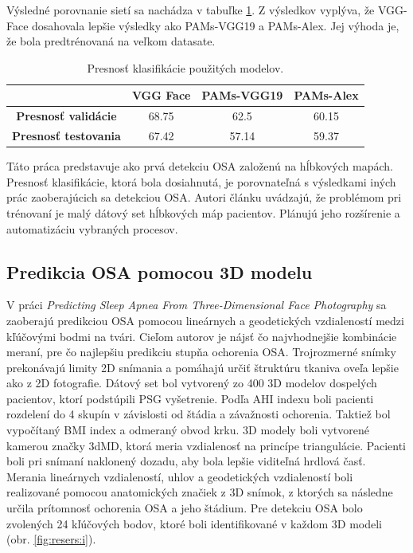 Výsledné porovnanie sietí sa nachádza v tabuľke \ref{tab:resers:2}. Z výsledkov vyplýva, že VGG-Face dosahovala lepšie výsledky ako PAMs-VGG19 a PAMs-Alex. Jej výhoda je, že bola predtrénovaná na veľkom datasate. 

\begin{table}[H]
	\caption{\label{tab:resers:2} Presnosť klasifikácie použitých modelov. }
	\centering
	\begin{tabular}{cccc}
		\toprule
		\textbf{} & \textbf{VGG Face} & \textbf{PAMs-VGG19} & \textbf{PAMs-Alex}     \\ 
		\midrule
		\textbf{Presnosť validácie}		& 68.75		& 62.5		& 60.15		\\ 
		\textbf{Presnosť testovania}	& 67.42		& 57.14  	& 59.37		\\ 
		\bottomrule
	\end{tabular}
\end{table}

Táto práca predstavuje ako prvá detekciu OSA založenú na hĺbkových mapách. Presnosť klasifikácie, ktorá bola dosiahnutá, je porovnateľná s výsledkami iných prác zaoberajúcich sa detekciou OSA. Autori článku uvádzajú, že problémom pri trénovaní je malý dátový set hĺbkových máp pacientov. Plánujú jeho rozšírenie a automatizáciu vybraných procesov. 

\subsection{Predikcia OSA pomocou 3D modelu}

V práci \textit{Predicting Sleep Apnea From Three-Dimensional Face Photography} sa zaoberajú predikciou OSA pomocou lineárnych a geodetických vzdialeností medzi kľúčovými bodmi na tvári. Cieľom autorov je nájsť čo najvhodnejšie kombinácie meraní, pre čo najlepšiu predikciu stupňa ochorenia OSA. 
Trojrozmerné snímky prekonávajú limity 2D snímania a pomáhajú určiť štruktúru tkaniva oveľa lepšie ako z 2D fotografie. Dátový set bol vytvorený zo 400 3D modelov dospelých pacientov, ktorí podstúpili PSG vyšetrenie. Podľa AHI indexu boli pacienti rozdelení do 4 skupín v závislosti od štádia a závažnosti ochorenia. Taktiež bol vypočítaný BMI index a odmeraný obvod krku. 3D modely boli vytvorené kamerou značky 3dMD, ktorá meria vzdialenosť na princípe triangulácie. Pacienti boli pri snímaní naklonený dozadu, aby bola lepšie viditeľná hrdlová časť. Merania lineárnych vzdialeností, uhlov a geodetických vzdialeností boli realizované pomocou anatomických značiek z 3D snímok, z ktorých sa následne určila prítomnosť ochorenia OSA a jeho štádium. Pre detekciu OSA bolo zvolených 24 kľúčových bodov, ktoré boli identifikované v každom 3D modeli (obr. \ref{fig:resers:i}). 



